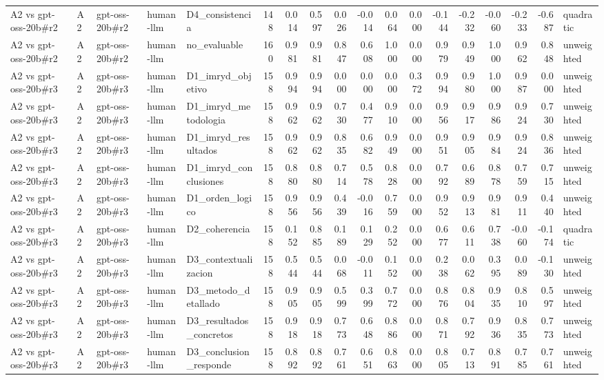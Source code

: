 \begin{table}
{\begin{tabular}{lllllrrrrrrrrrrrrl}
A2 vs gpt-oss-20b\#r2 & A2 & gpt-oss-20b\#r2 & human-llm & D4\_consistencia & 148 & 0.014 & 0.597 & 0.026 & -0.014 & 0.064 & 0.000 & -0.144 & -0.232 & -0.060 & -0.233 & -0.687 & quadratic \\
A2 vs gpt-oss-20b\#r2 & A2 & gpt-oss-20b\#r2 & human-llm & no\_evaluable & 160 & 0.981 & 0.981 & 0.847 & 0.608 & 1.000 & 0.000 & 0.979 & 0.949 & 1.000 & 0.962 & 0.848 & unweighted \\
A2 vs gpt-oss-20b\#r3 & A2 & gpt-oss-20b\#r3 & human-llm & D1\_imryd\_objetivo & 158 & 0.994 & 0.994 & 0.000 & 0.000 & 0.000 & 0.372 & 0.994 & 0.980 & 1.000 & 0.987 & 0.000 & unweighted \\
A2 vs gpt-oss-20b\#r3 & A2 & gpt-oss-20b\#r3 & human-llm & D1\_imryd\_metodologia & 158 & 0.962 & 0.962 & 0.730 & 0.477 & 0.910 & 0.000 & 0.956 & 0.917 & 0.986 & 0.924 & 0.730 & unweighted \\
A2 vs gpt-oss-20b\#r3 & A2 & gpt-oss-20b\#r3 & human-llm & D1\_imryd\_resultados & 158 & 0.962 & 0.962 & 0.835 & 0.682 & 0.949 & 0.000 & 0.951 & 0.905 & 0.984 & 0.924 & 0.836 & unweighted \\
A2 vs gpt-oss-20b\#r3 & A2 & gpt-oss-20b\#r3 & human-llm & D1\_imryd\_conclusiones & 158 & 0.880 & 0.880 & 0.714 & 0.578 & 0.828 & 0.000 & 0.792 & 0.689 & 0.878 & 0.759 & 0.715 & unweighted \\
A2 vs gpt-oss-20b\#r3 & A2 & gpt-oss-20b\#r3 & human-llm & D1\_orden\_logico & 158 & 0.956 & 0.956 & 0.439 & -0.016 & 0.759 & 0.000 & 0.952 & 0.913 & 0.981 & 0.911 & 0.440 & unweighted \\
A2 vs gpt-oss-20b\#r3 & A2 & gpt-oss-20b\#r3 & human-llm & D2\_coherencia & 158 & 0.152 & 0.885 & 0.189 & 0.129 & 0.252 & 0.000 & 0.677 & 0.611 & 0.738 & -0.060 & -0.174 & quadratic \\
A2 vs gpt-oss-20b\#r3 & A2 & gpt-oss-20b\#r3 & human-llm & D3\_contextualizacion & 158 & 0.544 & 0.544 & 0.068 & -0.011 & 0.152 & 0.000 & 0.238 & 0.062 & 0.395 & 0.089 & -0.130 & unweighted \\
A2 vs gpt-oss-20b\#r3 & A2 & gpt-oss-20b\#r3 & human-llm & D3\_metodo\_detallado & 158 & 0.905 & 0.905 & 0.599 & 0.399 & 0.772 & 0.000 & 0.876 & 0.804 & 0.935 & 0.810 & 0.597 & unweighted \\
A2 vs gpt-oss-20b\#r3 & A2 & gpt-oss-20b\#r3 & human-llm & D3\_resultados\_concretos & 158 & 0.918 & 0.918 & 0.773 & 0.648 & 0.886 & 0.000 & 0.871 & 0.792 & 0.936 & 0.835 & 0.773 & unweighted \\
A2 vs gpt-oss-20b\#r3 & A2 & gpt-oss-20b\#r3 & human-llm & D3\_conclusion\_responde & 158 & 0.892 & 0.892 & 0.761 & 0.651 & 0.863 & 0.000 & 0.805 & 0.713 & 0.891 & 0.785 & 0.761 & unweighted \\

\end{tabular}}
\end{table}

